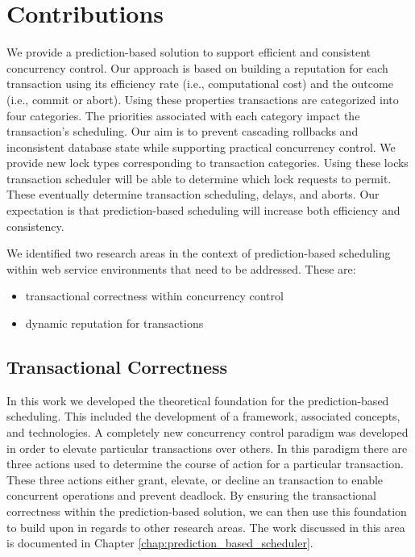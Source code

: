 \section{Contributions}
We provide a prediction-based solution to support efficient and consistent concurrency control. Our approach is based on building a reputation for each transaction using its efficiency rate (i.e., computational cost) and the outcome (i.e., commit or abort). Using these properties transactions are categorized into four categories. The priorities associated with each category impact the transaction's scheduling. Our aim is to prevent cascading rollbacks and inconsistent database state while supporting practical concurrency control. We provide new lock types corresponding to transaction categories. Using these locks transaction scheduler will be able to determine which lock requests to permit. These eventually determine transaction scheduling, delays, and aborts. Our expectation is that prediction-based scheduling will increase both efficiency and consistency.

We identified two research areas in the context of prediction-based scheduling within web service environments that need to be addressed. These are:
\begin{itemize}
    \item transactional correctness within concurrency control
    \item dynamic reputation for transactions
\end{itemize}

\subsection{Transactional Correctness}
In this work we developed the theoretical foundation for the prediction-based scheduling. This included the development of a framework, associated concepts, and technologies. A completely new concurrency control paradigm was developed in order to elevate particular transactions over others. In this paradigm there are three actions used to determine the course of action for a particular transaction. These three actions either grant, elevate, or decline an transaction to enable concurrent operations and prevent deadlock. By ensuring the transactional correctness within the prediction-based solution, we can then use this foundation to build upon in regards to other research areas. The work discussed in this area is documented in Chapter \ref{chap:prediction_based_scheduler}.

